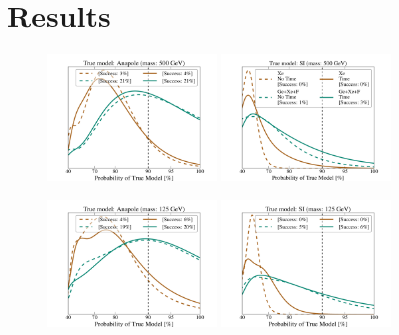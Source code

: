 \documentclass[11pt, a4paper]{article}
\begin{document}
\section{Results}\label{sec:results}
\begin{figure}
\centering
\includegraphics[width=0.4\textwidth, trim=.6cm 0.0cm .6cm 0.0cm,clip=true]{plots/PDF_Single_500GeV_Anapole_50sims_Xe_vs_FGeXe_GF_TNT.pdf}
\includegraphics[width=0.4\textwidth, trim=.6cm 0.0cm .6cm 0.0cm,clip=true]{plots/PDF_Single_500GeV_SI_Higgs_50sims_Xe_vs_FGeXe_GF_TNT.pdf}

\includegraphics[width=0.4\textwidth, trim=.6cm 0.0cm .6cm 0.0cm,clip=true]{plots/PDF_Single_125GeV_Anapole_50sims_Xe_vs_FGeXe_GF_TNT.pdf}
\includegraphics[width=0.4\textwidth, trim=.6cm 0.0cm .6cm 0.0cm,clip=true]{plots/PDF_Single_125GeV_SI_Higgs_50sims_Xe_vs_FGeXe_GF_TNT.pdf}


\end{figure}
\end{document}
